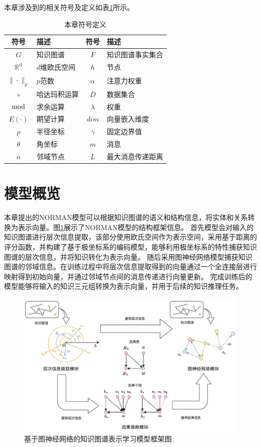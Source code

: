 \documentclass[algorithmlist, AutoFakeBold, AutoFakeSlant, figurelist, tablelist, nomlist, engineering, openany]{seuthesix} %
\begin{document}
本章涉及到的相关符号及定义如表\ref{2_symbols}所示。
\begin{table}[ht]
  \centering
  \caption{本章符号定义}
  \begin{tabular*}{0.8\textwidth}{@{\extracolsep{\fill}}clcl}
		\toprule[1pt]
    符号 & 描述 & 符号 & 描述 \\ \hline
    $G$ & 知识图谱 & $F$ & 知识图谱事实集合\\
    $\mathbb{R}^{\mathrm{d}}$ & $d$维欧氏空间 & $h$ & 节点\\
    $\|\cdot\|_{p}$ & $p$范数 & $\alpha$ & 注意力权重\\
    $\circ$ & 哈达玛积运算 & $D$ & 数据集合\\
    $\bmod$ & 求余运算 & $\lambda$ & 权重\\ 
    $E(\cdot)$ & 期望计算 & $dim$ & 向量嵌入维度\\
    $\rho$ & 半径坐标 & $\gamma$ & 固定边界值\\
    $\theta$ & 角坐标 & $m$ & 消息\\
    $n$ & 邻域节点 & $L$ & 最大消息传递距离\\
		\bottomrule[1pt]
	\end{tabular*}
  \label{2_symbols}
\end{table}

\section{模型概览}
本章提出的NORMAN模型可以根据知识图谱的语义和结构信息，将实体和关系转换为表示向量。图\ref{2_NORMAN}展示了NORMAN模型的结构框架信息。
首先模型会对输入的知识图谱进行层次信息提取，该部分使用欧氏空间作为表示空间，采用基于距离的评分函数，并构建了基于极坐标系的编码模型，能够利用极坐标系的特性捕获知识图谱的层次信息，并将知识转化为表示向量。
随后采用图神经网络模型捕获知识图谱的邻域信息。在训练过程中将层次信息提取得到的向量通过一个全连接层进行映射得到初始向量，并通过邻域节点间的消息传递进行向量更新。
完成训练后的模型能够将输入的知识三元组转换为表示向量，并用于后续的知识推理任务。
\begin{figure}[H]
  \centering
  \includegraphics[width=1.0\textwidth]{2_NORMAN}
  \caption{基于图神经网络的知识图谱表示学习模型框架图}
  \label{2_NORMAN}
\end{figure}
\end{document}

